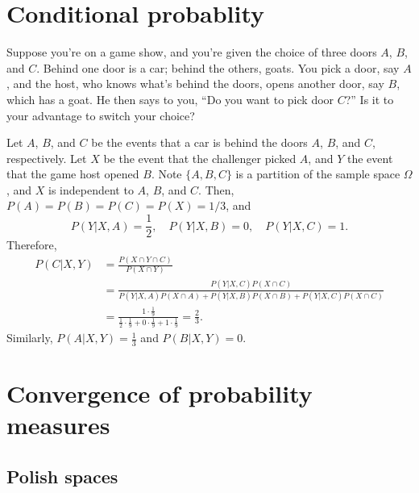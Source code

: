 \documentclass{../note}
\begin{document}
\begin{prb}

\end{prb}









\chapter{Conditional probablity}

\begin{prb}
Suppose you're on a game show, and you're given the choice of three doors $A$, $B$, and $C$.
Behind one door is a car; behind the others, goats.
You pick a door, say $A$, and the host, who knows what's behind the doors, opens another door, say $B$, which has a goat.
He then says to you, ``Do you want to pick door $C$?''
Is it to your advantage to switch your choice?
\end{prb}
\begin{pf}
Let $A$, $B$, and $C$ be the events that a car is behind the doors $A$, $B$, and $C$, respectively.
Let $X$ be the event that the challenger picked $A$, and $Y$ the event that the game host opened $B$.
Note $\{A,B,C\}$ is a partition of the sample space $\Omega$, and $X$ is independent to $A$, $B$, and $C$.
Then, $P(A)=P(B)=P(C)=P(X)=1/3$, and
\[P(Y|X,A)=\frac12,\quad P(Y|X,B)=0,\quad P(Y|X,C)=1.\]
Therefore,
\begin{align*}
P(C|X,Y)&=\frac{P(X\cap Y\cap C)}{P(X\cap Y)}\\
&=\frac{P(Y|X,C)P(X\cap C)}{P(Y|X,A)P(X\cap A)+P(Y|X,B)P(X\cap B)+P(Y|X,C)P(X\cap C)}\\
&=\frac{1\cdot \frac19}{\frac12\cdot\frac19+0\cdot\frac19+1\cdot\frac19}=\frac23.
\end{align*}
Similarly, $P(A|X,Y)=\frac13$ and $P(B|X,Y)=0$.
\end{pf}












\chapter{Convergence of probability measures}


\section{Polish spaces}
\end{document}
